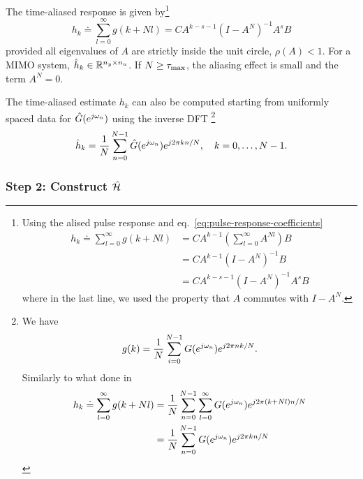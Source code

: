 The time-aliased response is given by\footnote{Using the alised pulse response and eq.~\eqref{eq:pulse-response-coefficients}
  \begin{align*}
    h_k \doteq \sum_{l=0}^\infty g(k+Nl) &= CA^{k-1} \left(\sum_{l=0}^\infty A^{Nl}\right) B \\
                                         &= CA^{k-1} \left(I - A^N\right)^{-1}B \\
                                         &= CA^{k-s-1}\left(I - A^N\right)^{-1}A^sB
  \end{align*}
  where in the last line, we used the property that $A$ commutes with $I-A^N$.\label{fn:commutation}}
\begin{equation*}
  h_k \doteq \sum_{l=0}^\infty g(k+Nl) = CA^{k-s-1}\left(I - A^N\right)^{-1}A^sB
\end{equation*}
provided all eigenvalues of $A$ are strictly inside the unit circle, $\rho(A)<1$. For a MIMO system, $\hat{h}_k \in \mathbb{R}^{n_y\times n_u}$. If $N \geq \tau_\text{max}$, the aliasing effect is small and the term $A^N = 0$.

The time-aliased estimate $h_k$ can also be computed starting from uniformly spaced data for $\hat{G}(e^{j\omega_n})$
using the inverse DFT
\footnote{We have
  \begin{equation*}
    g(k) = \frac{1}{N}\sum_{i=0}^{N-1} G(e^{j\omega_n}) e^{j2\pi nk/N}.
  \end{equation*}
  Similarly to what done in~\cite{smith-suppl13}
  \begin{align*}
    h_k \doteq \sum_{l=0}^\infty g(k+Nl) &= \frac{1}{N} \sum_{n=0}^{N-1} \sum_{l=0}^\infty G(e^{j\omega_n}) e^{j2\pi (k+Nl)n/N} \\
                                         &= \frac{1}{N} \sum_{n=0}^{N-1} G(e^{j\omega_n}) e^{j2\pi kn/N}
  \end{align*}}
\begin{equation*}
  \hat{h}_k = \frac{1}{N} \sum_{n=0}^{N-1} \hat{G}(e^{j\omega_n}) e^{j2\pi kn/N},\hspace{1em}k = 0,\ldots , N-1.
\end{equation*}


\subsubsection{Step 2: Construct $\hat{\mathcal{H}}$}

